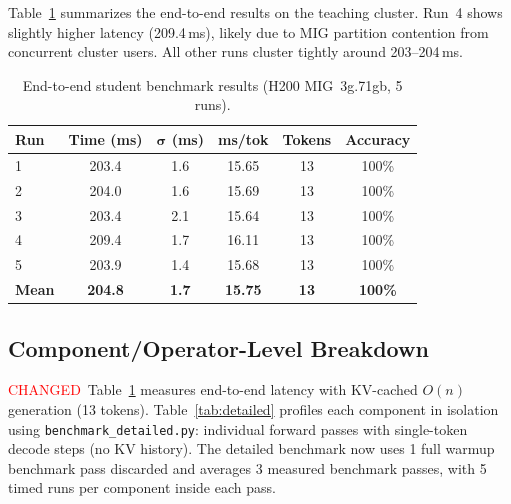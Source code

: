 \documentclass{article}
\newcommand{\chg}[1]{{\color{blue}#1}}
\newcommand{\chglabel}{{\setlength{\fboxsep}{1pt}\colorbox{yellow!45}{\textcolor{red}{\scriptsize CHANGED}}}}
\begin{document}
Table~\ref{tab:e2e} summarizes the end-to-end results on the teaching cluster.  Run~4 shows slightly higher latency (209.4\,ms), likely due to MIG partition contention from concurrent cluster users. All other runs cluster tightly around 203--204\,ms.

\begin{table}[h]
\centering
\caption{End-to-end student benchmark results (H200 MIG~3g.71gb, 5 runs).}
\label{tab:e2e}
\small
\begin{tabular}{@{}lccccc@{}}
\toprule
\textbf{Run} & \textbf{Time (ms)} & $\boldsymbol{\sigma}$ \textbf{(ms)} & \textbf{ms/tok} & \textbf{Tokens} & \textbf{Accuracy} \\
\midrule
1 & 203.4 & 1.6 & 15.65 & 13 & 100\% \\
2 & 204.0 & 1.6 & 15.69 & 13 & 100\% \\
3 & 203.4 & 2.1 & 15.64 & 13 & 100\% \\
4 & 209.4 & 1.7 & 16.11 & 13 & 100\% \\
5 & 203.9 & 1.4 & 15.68 & 13 & 100\% \\
\midrule
\textbf{Mean} & \textbf{204.8} & \textbf{1.7} & \textbf{15.75} & \textbf{13} & \textbf{100\%} \\
\bottomrule
\end{tabular}
\end{table}

\subsection{Component/Operator-Level Breakdown}

\chglabel\ \chg{Table~\ref{tab:e2e} measures end-to-end latency with KV-cached $O(n)$ generation (13 tokens).  Table~\ref{tab:detailed} profiles each component in isolation using \texttt{benchmark\_detailed.py}: individual forward passes with single-token decode steps (no KV history).  The detailed benchmark now uses 1 full warmup benchmark pass discarded and averages 3 measured benchmark passes, with 5 timed runs per component inside each pass.}
\end{document}
